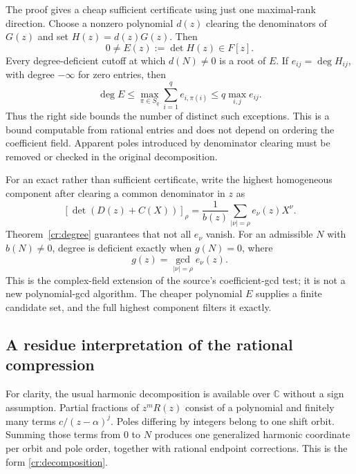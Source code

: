 The proof gives a cheap sufficient certificate using just one
maximal-rank direction.  Choose a nonzero polynomial $d(z)$ clearing
the denominators of $G(z)$ and set $H(z)=d(z)G(z)$.  Then
\begin{equation}\label{cr:certificate}
 0\ne E(z):=\det H(z)\in F[z].
\end{equation}
Every degree-deficient cutoff at which $d(N)\ne0$ is a root of
$E$.  If $e_{ij}=\deg H_{ij}$, with degree $-\infty$ for zero
entries, then
\begin{equation}\label{cr:degree-bound}
 \deg E\le \max_{\pi\in S_q}\sum_{i=1}^q e_{i,\pi(i)}
 \le q\max_{i,j}e_{ij}.
\end{equation}
Thus the right side bounds the number of distinct such exceptions.
This is a bound computable from rational entries and does not depend
on ordering the coefficient field.  Apparent poles introduced by
denominator clearing must be removed or checked in the original
decomposition.

For an exact rather than sufficient certificate, write the highest
homogeneous component after clearing a common denominator in $z$ as
\[
 [\det(D(z)+C(X))]_\rho
       =\frac{1}{b(z)}\sum_{|\nu|=\rho}e_\nu(z)X^\nu.
\]
Theorem~\ref{cr:degree} guarantees that not all $e_\nu$ vanish.
For an admissible $N$ with $b(N)\ne0$, degree is deficient exactly
when $g(N)=0$, where
\begin{equation}\label{cr:gcd}
 g(z)=\gcd_{|\nu|=\rho}e_\nu(z).
\end{equation}
This is the complex-field extension
of the source's coefficient-gcd test; it is not a new polynomial-gcd
algorithm.  The cheaper polynomial $E$ supplies a finite candidate
set, and the full highest component filters it exactly.

\subsection{A residue interpretation of the rational compression}

For clarity, the usual harmonic decomposition is available over
$\mathbb C$ without a sign assumption.  Partial fractions of
$z^mR(z)$ consist of a polynomial and finitely many terms
$c/(z-\alpha)^j$.  Poles differing by integers belong to one shift
orbit.  Summing those terms from $0$ to $N$ produces one generalized
harmonic coordinate per orbit and pole order, together with rational
endpoint corrections.  This is the form \eqref{cr:decomposition}.

